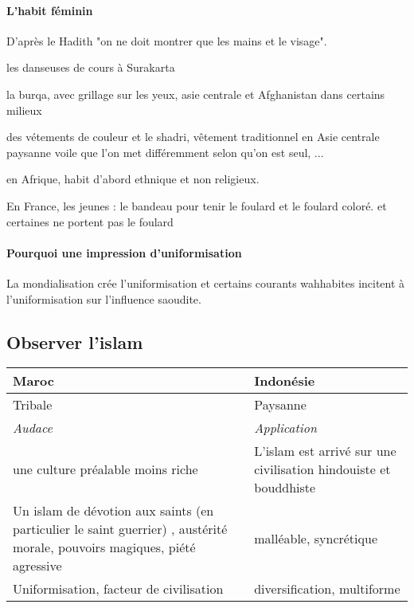 \ei 

\paragraph{L'habit féminin} D'après le Hadith "on ne doit montrer que les mains et le visage". 

\bi
\item les danseuses de cours à Surakarta
\item la burqa, avec grillage sur les yeux, asie centrale et Afghanistan dans certains milieux
\item des vétements de couleur et le shadri, vêtement traditionnel en Asie centrale paysanne voile que l'on met différemment selon qu'on est seul, ...
\item en Afrique, habit d'abord ethnique et non religieux. 
\item En France, les jeunes : le bandeau pour tenir le foulard et le foulard coloré. et certaines ne portent pas le foulard
\ei 

\paragraph{Pourquoi une impression d'uniformisation} La mondialisation crée l'uniformisation et certains courants wahhabites incitent à l'uniformisation sur l'influence saoudite.

\subsection{Observer l'islam}

 
\newlength\q
\setlength{}

\begin{table}[h!]
\noindent\begin{tabular}{p{\q}p{\q}}
\toprule
\textbf{Maroc}                                                     & \textbf{Indonésie}                                               \\ 
\midrule
Tribale                                                            & Paysanne                                                         \\
\textit{Audace}                                                    & \textit{Application}                                             \\
une culture préalable moins riche                                  & L'islam est arrivé sur une civilisation hindouiste et bouddhiste \\
Un islam de dévotion aux saints (en particulier le saint guerrier) , austérité morale, pouvoirs magiques, piété agressive & malléable, syncrétique  \\
Uniformisation, facteur de civilisation & diversification, multiforme\\

\bottomrule
\end{tabular}
\end{table}


